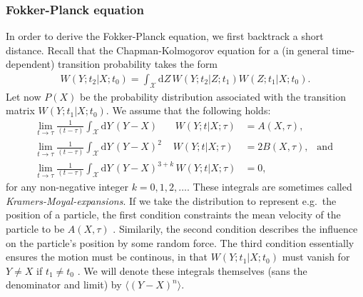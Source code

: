 \documentclass[../../master.tex]{subfiles}
\begin{document}
\subsubsection{Fokker-Planck equation}
In order to derive the Fokker-Planck equation, we first backtrack a short distance. Recall that the Chapman-Kolmogorov equation for a (in general time-dependent) transition probability takes the form 
\begin{align}
W(Y;t_2|X;t_0) = \int_\mathcal{X}\mathrm{d}Z\, W(Y;t_2|Z;t_1)W(Z;t_1|X;t_0). 
\end{align} 
Let now $P(X)$ be the probability distribution associated with the transition matrix $W(Y;t_1|X;t_0)$. We assume that the following holds:
\begin{align}
\lim_{t\rightarrow \tau}  \frac{1}{(t-\tau)} \int_\mathcal{X}\mathrm{d}Y\,(Y-X)\phantom{{}^{a+b}}\,W(Y;t|X;\tau)&=A(X,\tau), \\
%
\lim_{t\rightarrow \tau} \frac{1}{(t-\tau)} \int_\mathcal{X}\mathrm{d}Y\,(Y-X)^2\phantom{{}^{+k}}\,W(Y;t|X;\tau)&=2B(X,\tau), \ \ \text{ and }\\
%
\lim_{t\rightarrow \tau} \frac{1}{(t-\tau)} \int_\mathcal{X}\mathrm{d}Y\,(Y-X)^{3+k}\,W(Y;t|X;\tau)&=0,
\end{align}
for any non-negative integer $k=0,1,2,\dots$. These integrals are sometimes called \emph{Kramers-Moyal-expansions}. If we take the distribution to represent e.g.\ the position of a particle, the first condition constraints the mean velocity of the particle to be $A(X,\tau)$ \cite{gilks}. Similarily, the second condition describes the influence on the particle's position by some random force. The third condition essentially ensures the motion must be continous, in that $W(Y;t_1|X;t_0)$ must vanish for $Y\not=X$ if $t_1\not=t_0$ \cite{gardiner}. We will denote these integrals themselves (sans the denominator and limit) by $\langle (Y-X)^n\rangle$.
\end{document}
